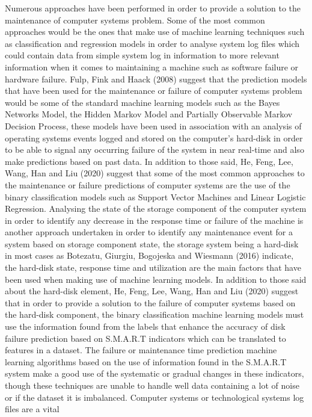 Numerous approaches have been performed in order to provide a solution to the maintenance of computer systems problem.
Some of the most common approaches would be the ones that make use of machine learning techniques such as
classification and regression models in order to analyse system log files which could contain data from simple
system log in information to more relevant information when it comes to maintaining a machine such as software
failure or hardware failure.  Fulp, Fink and Haack (2008) suggest that the prediction models that have been used
for the maintenance or failure of computer systems problem would be some of the standard machine learning models
such as the Bayes Networks Model, the Hidden Markov Model and Partially Observable Markov Decision Process,
these models have been used in association with an analysis of operating systems events logged and stored on
the computer’s hard-disk in order to be able to signal any occurring failure of the system in near real-time
and also make predictions based on past data. In addition to those said, He, Feng, Lee, Wang, Han and Liu (2020)
suggest that some of the most common approaches to the maintenance or failure predictions of computer systems
are the use of the binary classification models such as Support Vector Machines and Linear Logistic Regression.
Analysing the state of the storage component of the computer system in order to identify any decrease in the
response time or failure of the machine is another approach undertaken in order to identify any maintenance
event for a system based on storage component state, the storage system being a hard-disk in most cases as
Botezatu, Giurgiu, Bogojeska and Wiesmann (2016) indicate, the hard-disk state, response time and utilization
are the main factors that have been used when making use of machine learning models. In addition to those said
about the hard-disk element, He, Feng, Lee, Wang, Han and Liu (2020) suggest that in order to provide a solution
to the failure of computer systems based on the hard-disk component, the binary classification machine learning
models must use the information found from the labels that enhance the accuracy of disk failure prediction based
on S.M.A.R.T indicators which can be translated to features in a dataset. The failure or maintenance time prediction
machine learning algorithms based on the use of information found in the S.M.A.R.T system make a good use of the
systematic or gradual changes in these indicators, though these techniques are unable to handle well data containing
a lot of noise or if the dataset it is imbalanced. Computer systems or technological systems log files are a vital
